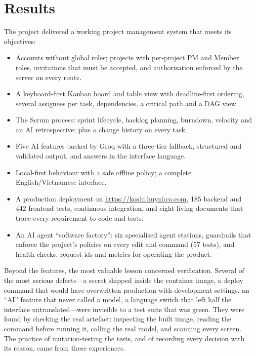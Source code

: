 \documentclass[../main.tex]{subfiles}
\begin{document}
\section*{Results}
The project delivered a working project management system that meets its objectives:
\begin{itemize}
  \item Accounts without global roles; projects with per-project PM and Member roles, invitations
        that must be accepted, and authorisation enforced by the server on every route.
  \item A keyboard-first Kanban board and table view with deadline-first ordering, several
        assignees per task, dependencies, a critical path and a DAG view.
  \item The Scrum process: sprint lifecycle, backlog planning, burndown, velocity and an AI
        retrospective; plus a change history on every task.
  \item Five AI features backed by Groq with a three-tier fallback, structured and validated output,
        and answers in the interface language.
  \item Local-first behaviour with a safe offline policy; a complete English/Vietnamese interface.
  \item A production deployment on \url{https://koshi.huynhca.com}, 185 backend and 442 frontend
        tests, continuous integration, and eight living documents that trace every requirement to
        code and tests.
  \item An AI agent ``software factory'': six specialised agent stations, guardrails that enforce
        the project's policies on every edit and command (57 tests), and health checks, request
        ids and metrics for operating the product.
\end{itemize}

Beyond the features, the most valuable lesson concerned verification. Several of the most serious
defects---a secret shipped inside the container image, a deploy command that would have overwritten
production with development settings, an ``AI'' feature that never called a model, a language
switch that left half the interface untranslated---were invisible to a test suite that was green.
They were found by checking the real artefact: inspecting the built image, reading the command
before running it, calling the real model, and scanning every screen. The practice of
mutation-testing the tests, and of recording every decision with its reason, came from these
experiences.
\end{document}
